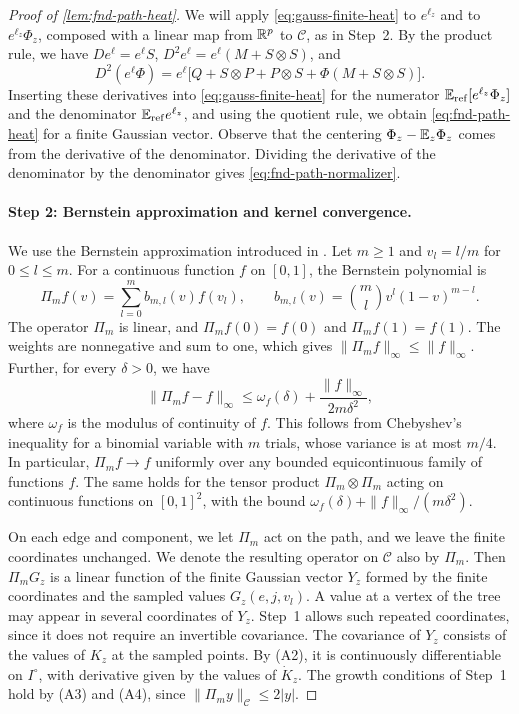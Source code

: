 \begin{proof}[Proof of \cref{lem:fnd-path-heat}]
We will apply \eqref{eq:gauss-finite-heat} to $e^{\ell_z}$ and to
$e^{\ell_z}\Phi_z$, composed with a linear map from $\mathbb R^p$ to
$\mathcal C$, as in Step~2. By the product rule, we have
$D e^{\ell}=e^{\ell}S$, $D^2e^{\ell}=e^{\ell}(M+S\otimes S)$, and
\[
 D^2(e^{\ell}\Phi)=e^{\ell}\bigl[Q+S\otimes P+P\otimes S+\Phi(M+S\otimes S)\bigr].
\]
Inserting these derivatives into \eqref{eq:gauss-finite-heat} for the
numerator $\mathbb E_{\rm ref}[e^{\ell_z}\Phi_z]$ and the denominator
$\mathbb E_{\rm ref}e^{\ell_z}$, and using the quotient rule, we obtain
\eqref{eq:fnd-path-heat} for a finite Gaussian vector. Observe that the
centering $\Phi_z-\mathbb E_z\Phi_z$ comes from the
derivative of the denominator.
Dividing the derivative of the denominator by the denominator gives
\eqref{eq:fnd-path-normalizer}.

\paragraph{Step 2: Bernstein approximation and kernel convergence.}
We use the Bernstein approximation introduced in
\cite{Bernstein1912}. Let $m\ge1$ and $v_l=l/m$ for $0\le l\le m$. For a
continuous function $f$ on $[0,1]$, the Bernstein polynomial is
\[
 \Pi_mf(v)=\sum_{l=0}^mb_{m,l}(v)f(v_l),\qquad
 b_{m,l}(v)=\binom ml v^l(1-v)^{m-l}.
\]
The operator $\Pi_m$ is linear, and $\Pi_mf(0)=f(0)$ and
$\Pi_mf(1)=f(1)$. The weights are nonnegative and sum to one, which
gives $\|\Pi_mf\|_\infty\le\|f\|_\infty$. Further, for every $\delta>0$, we have
\[
 \|\Pi_mf-f\|_\infty\le\omega_f(\delta)+\frac{\|f\|_\infty}{2m\delta^2},
\]
where $\omega_f$ is the modulus of continuity of $f$. This follows from
Chebyshev's inequality for a binomial variable with $m$ trials, whose
variance is at most $m/4$. In particular, $\Pi_mf\to f$ uniformly
over any bounded equicontinuous family of functions $f$. The same holds for the
tensor product $\Pi_m\otimes\Pi_m$ acting on continuous functions on
$[0,1]^2$, with the bound $\omega_f(\delta)+\|f\|_\infty/(m\delta^2)$.

On each edge and component, we let $\Pi_m$ act on the path, and we
leave the finite coordinates unchanged. We denote the resulting operator
on $\mathcal C$ also by $\Pi_m$. Then $\Pi_mG_z$ is a linear function of
the finite Gaussian vector $Y_z$ formed by the finite coordinates and
the sampled values $G_z(e,j,v_l)$. A value at a vertex of the tree may
appear in several coordinates of $Y_z$. Step~1 allows such repeated
coordinates, since it does not require an invertible covariance. The
covariance of $Y_z$ consists of the values of $K_z$ at the sampled
points. By (A2), it is continuously differentiable on $I^\circ$, with
derivative given by the values of $\dot K_z$. The growth conditions of
Step~1 hold by (A3) and (A4), since $\|\Pi_my\|_{\mathcal C}\le2|y|$.


\end{proof}
